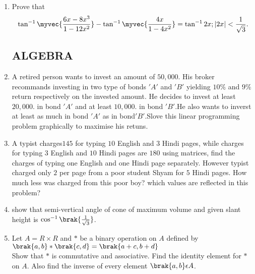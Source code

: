 \documentclass[12pt, -letter paper]{article}
\begin{document}
\begin{enumerate}
 \item Prove that \begin{align*}\tan^{-1}\myvec{\frac{6x-8x^3}{1-12x^2}}-\tan^{-1}\myvec{\frac{4x}{1-4x^2}}=\tan^{-1}2x;|2x|<\frac{1}{\sqrt{3}}. \end{align*}


     \subsection*{ALGEBRA}


  \item A retired person wants to invest an amount of \rupee$50,000$. His broker recommands investing in two type of bonds $'A'$ and $'B'$ yielding $10\%$ and $9\%$ return respectively on the invested amount. He decides to invest at least\rupee$20,000$. in bond $'A'$ and at least \rupee$10,000$. in bond $'B'$.He also wants to inverst at least as much in bond $'A'$ as in bond$'B'$.Slove this linear programming problem graphically to maximise his retuns.

\item A typist charges\rupee$145$ for typing $10$ English and    $3$ Hindi pages, while charges for typing $3$ English and $10$ Hindi pages are \rupee$180$ using matrices, find the charges of typing one English and one Hindi page separately. However typist charged only \rupee$2$  per page from a poor student Shyam for $5$ Hindi pages. How much less was charged from this poor boy? which values are reflected in this problem?
  



	  \item  show that semi-vertical angle of cone of maximum volume and given slant height is  $\cos^{-1}\brak{\frac{1}{\sqrt{3}}}$.
     
  \item Let $A=R\times R$ and $*$ be a binary operation on $A$ defined by\\ $\brak{a,b}*\brak{c,d}=\brak{a+c,b+d}$\\
	  Show that $*$ is commutative and associative. Find the identity element for $*$ on $A$. Also find the inverse of every element $\brak{a,b}\epsilon A$.

 

\end{enumerate}        
\end{document}
